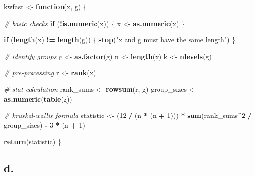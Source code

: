 \documentclass[
]{article}
\newenvironment{Shaded}{\begin{snugshade}}{\end{snugshade}}
\newcommand{\CommentTok}[1]{\textcolor[rgb]{0.56,0.35,0.01}{\textit{#1}}}
\newcommand{\ControlFlowTok}[1]{\textcolor[rgb]{0.13,0.29,0.53}{\textbf{#1}}}
\newcommand{\DecValTok}[1]{\textcolor[rgb]{0.00,0.00,0.81}{#1}}
\newcommand{\FunctionTok}[1]{\textcolor[rgb]{0.13,0.29,0.53}{\textbf{#1}}}
\newcommand{\NormalTok}[1]{#1}
\newcommand{\OtherTok}[1]{\textcolor[rgb]{0.56,0.35,0.01}{#1}}
\newcommand{\SpecialCharTok}[1]{\textcolor[rgb]{0.81,0.36,0.00}{\textbf{#1}}}
\newcommand{\StringTok}[1]{\textcolor[rgb]{0.31,0.60,0.02}{#1}}
\begin{document}
\begin{Shaded}
\begin{Highlighting}[]
\NormalTok{kwfast }\OtherTok{\textless{}{-}} \ControlFlowTok{function}\NormalTok{(x, g) \{}
  
  \CommentTok{\# basic checks}
  \ControlFlowTok{if}\NormalTok{ (}\SpecialCharTok{!}\FunctionTok{is.numeric}\NormalTok{(x)) \{}
\NormalTok{    x }\OtherTok{\textless{}{-}} \FunctionTok{as.numeric}\NormalTok{(x)}
\NormalTok{  \}}
  
  \ControlFlowTok{if}\NormalTok{ (}\FunctionTok{length}\NormalTok{(x) }\SpecialCharTok{!=} \FunctionTok{length}\NormalTok{(g)) \{}
    \FunctionTok{stop}\NormalTok{(}\StringTok{"\textquotesingle{}x\textquotesingle{} and \textquotesingle{}g\textquotesingle{} must have the same length"}\NormalTok{)}
\NormalTok{  \}}
  
  \CommentTok{\# identify groups}
\NormalTok{  g }\OtherTok{\textless{}{-}} \FunctionTok{as.factor}\NormalTok{(g)}
\NormalTok{  n }\OtherTok{\textless{}{-}} \FunctionTok{length}\NormalTok{(x)}
\NormalTok{  k }\OtherTok{\textless{}{-}} \FunctionTok{nlevels}\NormalTok{(g)}
  
  \CommentTok{\# pre{-}processing}
\NormalTok{  r }\OtherTok{\textless{}{-}} \FunctionTok{rank}\NormalTok{(x)}
  
  \CommentTok{\# stat calculation}
\NormalTok{  rank\_sums }\OtherTok{\textless{}{-}} \FunctionTok{rowsum}\NormalTok{(r, g)}
\NormalTok{  group\_sizes }\OtherTok{\textless{}{-}} \FunctionTok{as.numeric}\NormalTok{(}\FunctionTok{table}\NormalTok{(g))}
  
  \CommentTok{\# kruskal{-}wallis formula}
\NormalTok{  statistic }\OtherTok{\textless{}{-}}\NormalTok{ (}\DecValTok{12} \SpecialCharTok{/}\NormalTok{ (n }\SpecialCharTok{*}\NormalTok{ (n }\SpecialCharTok{+} \DecValTok{1}\NormalTok{))) }\SpecialCharTok{*} \FunctionTok{sum}\NormalTok{(rank\_sums}\SpecialCharTok{\^{}}\DecValTok{2} \SpecialCharTok{/}\NormalTok{ group\_sizes) }\SpecialCharTok{{-}} \DecValTok{3} \SpecialCharTok{*}\NormalTok{ (n }\SpecialCharTok{+} \DecValTok{1}\NormalTok{)}
  
  \FunctionTok{return}\NormalTok{(statistic)}
\NormalTok{\}}
\end{Highlighting}
\end{Shaded}

\subsection{d.}\label{d.-3}
\end{document}
